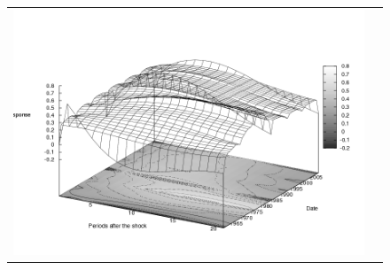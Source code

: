 \begin{figure}
\begin{tabular}{cc}
\includegraphics[scale=0.25]{results_wlsinit/Inflation_natshock_irf3d.png} \\ 
\end{tabular}
\end{figure}

